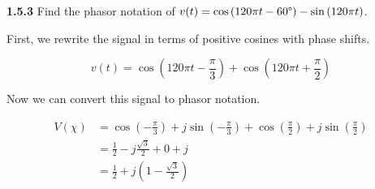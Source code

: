 \documentclass{article}
\begin{document}
\textbf{1.5.3} Find the phasor notation of $v(t) = \cos{(120\pi t - 60\degree)} - \sin{(120\pi t)}$.

\vspace{24pt}

First, we rewrite the signal in terms of positive cosines with phase shifts.

\begin{equation*}
	v(t) = \cos{(120\pi t - \frac{\pi}{3})} + \cos{(120\pi t + \frac{\pi}{2})}
\end{equation*}

Now we can convert this signal to phasor notation.

\begin{equation*}
	\begin{split}
		V(\chi) & = \cos{(-\frac{\pi}{3})} + j\sin{(-\frac{\pi}{3})} + \cos{(\frac{\pi}{2})} + j\sin{(\frac{\pi}{2})} \\
		& = \frac{1}{2} - j\frac{\sqrt{3}}{2} + 0 + j \\
		& = \frac{1}{2} + j(1 - \frac{\sqrt{3}}{2})
	\end{split}
\end{equation*}
\end{document}
